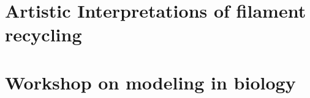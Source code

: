 \documentclass{ucetd}
\begin{document}
\chapter{Artistic Interpretations of filament recycling}


\chapter{Workshop on modeling in biology}



%
%
\makebibliography
\end{document}
